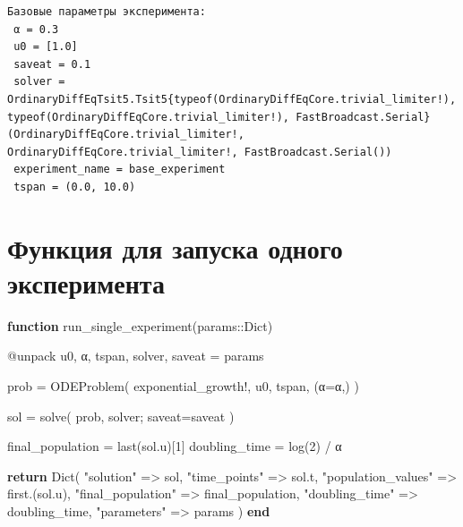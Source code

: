 \documentclass[
  russian,
  12pt,
  a4paper,
  DIV=11,
  numbers=noendperiod]{scrreprt}
\newenvironment{Shaded}{\begin{snugshade}}{\end{snugshade}}
\newcommand{\ControlFlowTok}[1]{\textcolor[rgb]{0.00,0.23,0.31}{\textbf{#1}}}
\newcommand{\DataTypeTok}[1]{\textcolor[rgb]{0.68,0.00,0.00}{#1}}
\newcommand{\FloatTok}[1]{\textcolor[rgb]{0.68,0.00,0.00}{#1}}
\newcommand{\FunctionTok}[1]{\textcolor[rgb]{0.28,0.35,0.67}{#1}}
\newcommand{\KeywordTok}[1]{\textcolor[rgb]{0.00,0.23,0.31}{\textbf{#1}}}
\newcommand{\NormalTok}[1]{\textcolor[rgb]{0.00,0.23,0.31}{#1}}
\newcommand{\OperatorTok}[1]{\textcolor[rgb]{0.37,0.37,0.37}{#1}}
\newcommand{\PreprocessorTok}[1]{\textcolor[rgb]{0.68,0.00,0.00}{#1}}
\newcommand{\StringTok}[1]{\textcolor[rgb]{0.13,0.47,0.30}{#1}}
\begin{document}
\begin{verbatim}
Базовые параметры эксперимента:
 α = 0.3
 u0 = [1.0]
 saveat = 0.1
 solver = OrdinaryDiffEqTsit5.Tsit5{typeof(OrdinaryDiffEqCore.trivial_limiter!), typeof(OrdinaryDiffEqCore.trivial_limiter!), FastBroadcast.Serial}(OrdinaryDiffEqCore.trivial_limiter!, OrdinaryDiffEqCore.trivial_limiter!, FastBroadcast.Serial())
 experiment_name = base_experiment
 tspan = (0.0, 10.0)
\end{verbatim}

\section{Функция для запуска одного
эксперимента}\label{ux444ux443ux43dux43aux446ux438ux44f-ux434ux43bux44f-ux437ux430ux43fux443ux441ux43aux430-ux43eux434ux43dux43eux433ux43e-ux44dux43aux441ux43fux435ux440ux438ux43cux435ux43dux442ux430}

\begin{Shaded}
\begin{Highlighting}[]
\KeywordTok{function} \FunctionTok{run\_single\_experiment}\NormalTok{(params}\OperatorTok{::}\DataTypeTok{Dict}\NormalTok{)}

    \PreprocessorTok{@unpack}\NormalTok{ u0, α, tspan, solver, saveat }\OperatorTok{=}\NormalTok{ params}

\NormalTok{    prob }\OperatorTok{=} \FunctionTok{ODEProblem}\NormalTok{(}
\NormalTok{        exponential\_growth!,}
\NormalTok{        u0,}
\NormalTok{        tspan,}
\NormalTok{        (α}\OperatorTok{=}\NormalTok{α,)}
\NormalTok{    )}

\NormalTok{    sol }\OperatorTok{=} \FunctionTok{solve}\NormalTok{(}
\NormalTok{        prob,}
\NormalTok{        solver;}
\NormalTok{        saveat}\OperatorTok{=}\NormalTok{saveat}
\NormalTok{    )}

\NormalTok{    final\_population }\OperatorTok{=} \FunctionTok{last}\NormalTok{(sol.u)[}\FloatTok{1}\NormalTok{]}
\NormalTok{    doubling\_time }\OperatorTok{=} \FunctionTok{log}\NormalTok{(}\FloatTok{2}\NormalTok{) }\OperatorTok{/}\NormalTok{ α}

    \ControlFlowTok{return} \FunctionTok{Dict}\NormalTok{(}
        \StringTok{"solution"} \OperatorTok{=\textgreater{}}\NormalTok{ sol,}
        \StringTok{"time\_points"} \OperatorTok{=\textgreater{}}\NormalTok{ sol.t,}
        \StringTok{"population\_values"} \OperatorTok{=\textgreater{}} \FunctionTok{first}\NormalTok{.(sol.u),}
        \StringTok{"final\_population"} \OperatorTok{=\textgreater{}}\NormalTok{ final\_population,}
        \StringTok{"doubling\_time"} \OperatorTok{=\textgreater{}}\NormalTok{ doubling\_time,}
        \StringTok{"parameters"} \OperatorTok{=\textgreater{}}\NormalTok{ params}
\NormalTok{    )}
\KeywordTok{end}
\end{Highlighting}
\end{Shaded}
\end{document}
